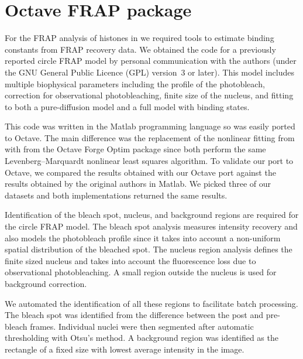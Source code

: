 \section{Octave FRAP package}
\label{sec:software:octave-frap}

For the FRAP analysis of histones
in  we required tools to estimate
binding constants from FRAP recovery data.  We obtained the code for a
previously reported circle FRAP model \citep{mcnally-frap-code} by
personal communication with the authors (under the GNU General Public
Licence (GPL) version~3 or later).  This model includes multiple
biophysical parameters including the profile of the photobleach, correction
for observational photobleaching, finite size of the nucleus, and
fitting to both a pure-diffusion model and a full model with binding
states.

This code was written in the Matlab programming language so was
easily ported to Octave.  The main difference was the replacement of
the nonlinear fitting from  with 
from the Octave Forge Optim package since both perform the same
Levenberg--Marquardt nonlinear least squares algorithm.
To validate our port to Octave, we compared the results obtained with
our Octave port against the results obtained by the original authors
in Matlab.  We picked three of our datasets and both implementations
returned the same results.

Identification of the bleach spot, nucleus, and background regions are
required for the circle FRAP model.  The bleach spot analysis measures
intensity recovery and also models the photobleach profile since it
takes into account a non-uniform spatial distribution of the bleached
spot.  The nucleus region analysis defines the finite sized nucleus and takes
into account the fluorescence loss due to observational
photobleaching.  A small region outside the nucleus is used for
background correction.

We automated the identification of all these regions to facilitate
batch processing.  The bleach spot was
identified from the difference between the post and pre-bleach frames.
Individual nuclei were then segmented after automatic thresholding with Otsu's
method.  A background region was identified as the rectangle of a
fixed size with lowest average intensity in the image.

